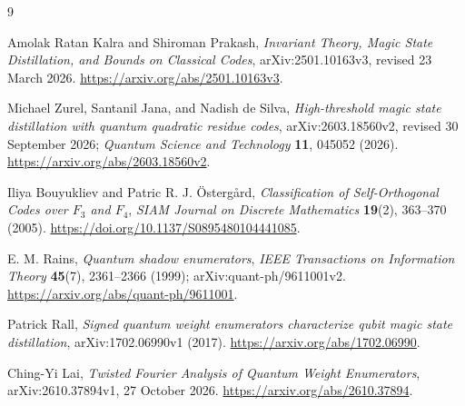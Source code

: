 \documentclass[11pt]{article}
\theoremstyle{remark}
\begin{document}
\begin{thebibliography}{9}

Amolak Ratan Kalra and Shiroman Prakash,
\emph{Invariant Theory, Magic State Distillation, and Bounds on Classical
Codes}, arXiv:2501.10163v3, revised 23 March 2026.
\url{https://arxiv.org/abs/2501.10163v3}.

Michael Zurel, Santanil Jana, and Nadish de Silva,
\emph{High-threshold magic state distillation with quantum quadratic
residue codes}, arXiv:2603.18560v2, revised 30 September 2026;
\emph{Quantum Science and Technology} \textbf{11}, 045052 (2026).
\url{https://arxiv.org/abs/2603.18560v2}.

Iliya Bouyukliev and Patric R. J. {\"O}sterg{\aa}rd,
\emph{Classification of Self-Orthogonal Codes over $F_3$ and $F_4$},
\emph{SIAM Journal on Discrete Mathematics} \textbf{19}(2),
363--370 (2005).
\url{https://doi.org/10.1137/S0895480104441085}.

E. M. Rains,
\emph{Quantum shadow enumerators},
\emph{IEEE Transactions on Information Theory} \textbf{45}(7),
2361--2366 (1999); arXiv:quant-ph/9611001v2.
\url{https://arxiv.org/abs/quant-ph/9611001}.

Patrick Rall,
\emph{Signed quantum weight enumerators characterize qubit magic state
distillation}, arXiv:1702.06990v1 (2017).
\url{https://arxiv.org/abs/1702.06990}.

Ching-Yi Lai,
\emph{Twisted Fourier Analysis of Quantum Weight Enumerators},
arXiv:2610.37894v1, 27 October 2026.
\url{https://arxiv.org/abs/2610.37894}.

\end{thebibliography}
\end{document}
